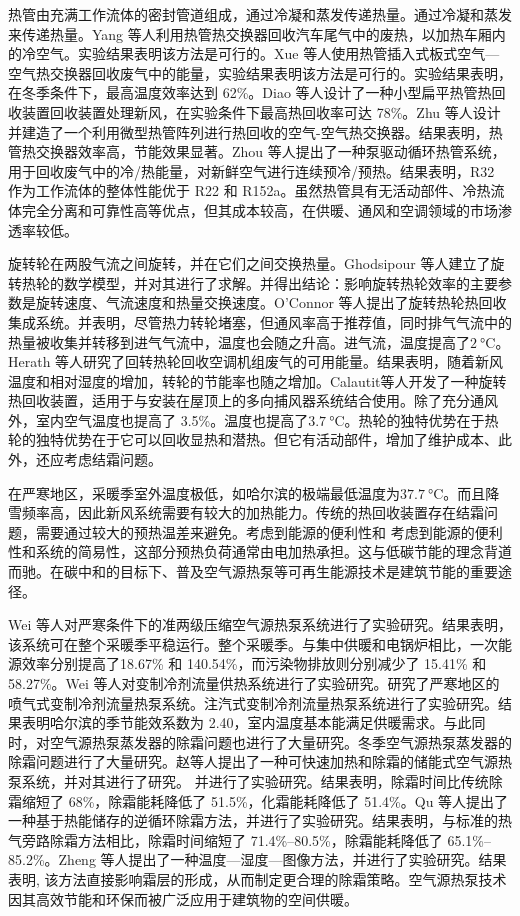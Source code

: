 热管由充满工作流体的密封管道组成，通过冷凝和蒸发传递热量。通过冷凝和蒸发来传递热量。Yang 等人利用热管热交换器回收汽车尾气中的废热，以加热车厢内的冷空气。实验结果表明该方法是可行的。Xue 等人使用热管插入式板式空气---空气热交换器回收废气中的能量，实验结果表明该方法是可行的。实验结果表明，在冬季条件下，最高温度效率达到 62\%。Diao 等人设计了一种小型扁平热管热回收装置回收装置处理新风，在实验条件下最高热回收率可达 78\%。Zhu 等人设计并建造了一个利用微型热管阵列进行热回收的空气-空气热交换器。结果表明，热管热交换器效率高，节能效果显著。Zhou 等人提出了一种泵驱动循环热管系统，用于回收废气中的冷/热能量，对新鲜空气进行连续预冷/预热。结果表明，R32 作为工作流体的整体性能优于 R22 和 R152a。虽然热管具有无活动部件、冷热流体完全分离和可靠性高等优点，但其成本较高，在供暖、通风和空调领域的市场渗透率较低。

旋转轮在两股气流之间旋转，并在它们之间交换热量。Ghodsipour 等人建立了旋转热轮的数学模型，并对其进行了求解。并得出结论：影响旋转热轮效率的主要参数是旋转速度、气流速度和热量交换速度。O'Connor 等人提出了旋转热轮热回收集成系统。并表明，尽管热力转轮堵塞，但通风率高于推荐值，同时排气气流中的热量被收集并转移到进气气流中，温度也会随之升高。进气流，温度提高了$\qty{2}{\degreeCelsius} $。Herath 等人研究了回转热轮回收空调机组废气的可用能量。结果表明，随着新风温度和相对湿度的增加，转轮的节能率也随之增加。Calautit等人开发了一种旋转热回收装置，适用于与安装在屋顶上的多向捕风器系统结合使用。除了充分通风外，室内空气温度也提高了 3.5\%。温度也提高了$\qty{3.7}{\degreeCelsius} $。热轮的独特优势在于热轮的独特优势在于它可以回收显热和潜热。但它有活动部件，增加了维护成本、此外，还应考虑结霜问题。

在严寒地区，采暖季室外温度极低，如哈尔滨的极端最低温度为$\qty{37.7}{\degreeCelsius}$。而且降雪频率高，因此新风系统需要有较大的加热能力。传统的热回收装置存在结霜问题，需要通过较大的预热温差来避免。考虑到能源的便利性和 考虑到能源的便利性和系统的简易性，这部分预热负荷通常由电加热承担。这与低碳节能的理念背道而驰。在碳中和的目标下、普及空气源热泵等可再生能源技术是建筑节能的重要途径。

Wei 等人对严寒条件下的准两级压缩空气源热泵系统进行了实验研究。结果表明，该系统可在整个采暖季平稳运行。整个采暖季。与集中供暖和电锅炉相比，一次能源效率分别提高了18.67\% 和 140.54\%，而污染物排放则分别减少了 15.41\% 和 58.27\%。Wei 等人对变制冷剂流量供热系统进行了实验研究。研究了严寒地区的喷气式变制冷剂流量热泵系统。注汽式变制冷剂流量热泵系统进行了实验研究。结果表明哈尔滨的季节能效系数为 2.40，室内温度基本能满足供暖需求。与此同时，对空气源热泵蒸发器的除霜问题也进行了大量研究。冬季空气源热泵蒸发器的除霜问题进行了大量研究。赵等人提出了一种可快速加热和除霜的储能式空气源热泵系统，并对其进行了研究。
并进行了实验研究。结果表明，除霜时间比传统除霜缩短了 68\%，除霜能耗降低了 51.5\%，化霜能耗降低了 51.4\%。Qu 等人提出了一种基于热能储存的逆循环除霜方法，并进行了实验研究。结果表明，与标准的热气旁路除霜方法相比，除霜时间缩短了 71.4\%--80.5\%，除霜能耗降低了 65.1\%--85.2\%。Zheng 等人提出了一种温度---湿度---图像方法，并进行了实验研究。结果表明, 该方法直接影响霜层的形成，从而制定更合理的除霜策略。空气源热泵技术因其高效节能和环保而被广泛应用于建筑物的空间供暖。

